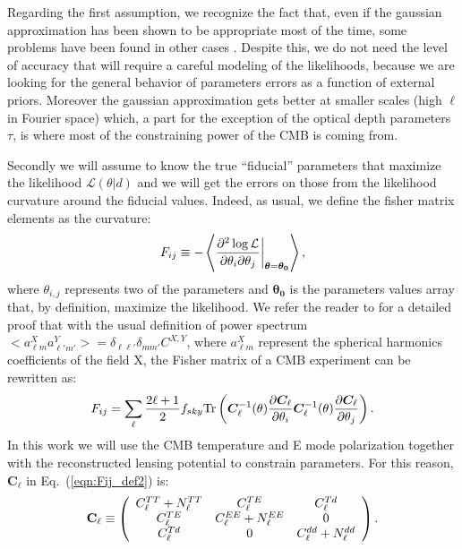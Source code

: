 \documentclass[aps,prd,reprint,superscriptaddress]{revtex4-1}
\newcommand\refeq[1]{Eq.~(\ref{eqn:#1})}
\begin{document}
Regarding the first assumption, we recognize the fact that, even if the gaussian approximation has been shown to be appropriate most of the time, some problems have been found in other cases \cite{2012JCAP...09..009W}. Despite this, we do not need the level of accuracy that will require a careful modeling of the likelihoods, because we are looking for the general behavior of parameters errors as a function of external priors.
Moreover the gaussian approximation gets better at smaller scales (high $\ell$ in Fourier space) which, a part for the exception of the optical depth parameters $\tau$, is where most of the constraining power of the CMB is coming from.

 
Secondly we will assume to know the true ``fiducial'' parameters that maximize the likelihood $\mathcal{L}(\theta|d)$ and we will get the errors on those from the likelihood curvature around the fiducial values.
Indeed, as usual, we define the fisher matrix elements as the curvature:
\begin{equation}
	\centering
		F_{ij} \equiv - \left\langle\frac{\partial^2 \log \mathcal{L}}{\partial \theta_i \partial \theta_j} \bigg|_{\boldsymbol{\theta} = \boldsymbol{\theta_0}}\right\rangle,
	\label{eqn:Fij_def}
\end{equation}
where $\theta_{i,j}$ represents two of the parameters and $\boldsymbol{\theta_0}$ is the parameters values array that, by definition, maximize the likelihood.
We refer the reader to \cite{} for a detailed proof that with the usual definition of power spectrum $<a_{\ell m}^{X}a_{\ell' m'}^{Y}>=\delta_{\ell \ell'}\delta_{mm'}C^{X,Y}$, where $a_{\ell m}^{X}$ represent the spherical harmonics coefficients of the field X, the Fisher matrix of a CMB experiment can be rewritten as:
\begin{equation}
 F_{ij} = \sum_\ell \frac{2\ell+1}{2} f_{sky} {\rm Tr} \left(  \boldsymbol{C}^{-1}_\ell( \theta) \frac{\partial \boldsymbol{C}_\ell}{\partial \theta_i} \boldsymbol{C}^{-1}_\ell( \theta) \frac{\partial \boldsymbol{C}_\ell}{\partial \theta_j}  \right).
 \label{eqn:Fij_def2}
 \end{equation}
 In this work we will use the CMB temperature and E mode polarization together with the reconstructed lensing potential to constrain parameters. For this reason, $\boldsymbol{C}_\ell$ in \refeq{Fij_def2} is:
 \begin{eqnarray}
 	\centering
		\mathbf{C}_\ell \equiv \left( \begin{array}{ccc}C_\ell^{TT} + N_\ell^{TT} & C_\ell^{TE} & C_\ell^{Td} \\ C_\ell^{TE} & C_\ell^{EE} + N_\ell^{EE} & 0 \\ C_\ell^{Td} & 0 & C_\ell^{dd} + N_\ell^{dd}\end{array}\right).
	\label{eqn:cov_definition}
\end{eqnarray}
\end{document}
